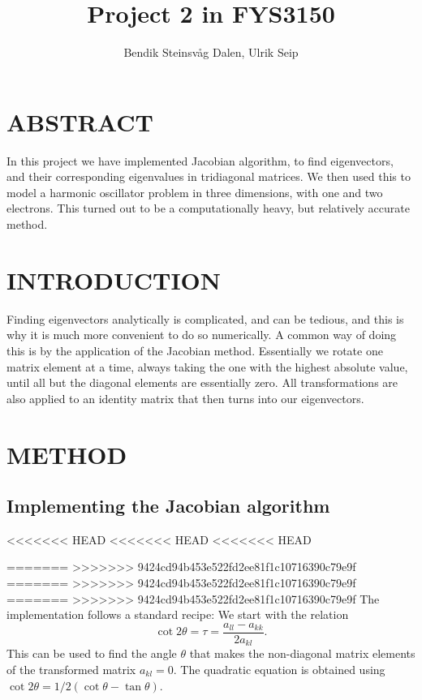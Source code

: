 \documentclass[a4paper]{article}
\title{Project 2 in FYS3150}
\author{Bendik Steinsvåg Dalen, Ulrik Seip}
\begin{document}
\maketitle

\section{ABSTRACT}

In this project we have implemented Jacobian algorithm, to find eigenvectors, and their corresponding eigenvalues in tridiagonal matrices. We then used this to model a harmonic oscillator problem in three dimensions, with one and two electrons. This turned out to be a computationally heavy, but relatively accurate method.

\section{INTRODUCTION}

Finding eigenvectors analytically is complicated, and can be tedious, and this is why it is much more convenient to do so numerically. A common way of doing this is by the application of the Jacobian method. Essentially we rotate one matrix element at a time, always taking the one with the highest absolute value, until all but the diagonal elements are essentially zero. All transformations are also applied to an identity matrix that then turns into our eigenvectors. 

\section{METHOD}

\subsection{Implementing the Jacobian algorithm}
<<<<<<< HEAD
<<<<<<< HEAD
<<<<<<< HEAD

=======
>>>>>>> 9424cd94b453e522fd2ee81f1c10716390c79e9f
=======
>>>>>>> 9424cd94b453e522fd2ee81f1c10716390c79e9f
=======
>>>>>>> 9424cd94b453e522fd2ee81f1c10716390c79e9f
The implementation follows a standard recipe:
We start with the relation
\begin{equation*}\cot 2\theta=\tau = \frac{a_{ll}-a_{kk}}{2a_{kl}}.
\end{equation*}
This can be used to find the angle $\theta$ that makes the  non-diagonal matrix elements of the transformed matrix 
$a_{kl} = 0$. The quadratic equation is obtained using $\cot 2\theta=1/2(\cot\theta-\tan\theta)$.
\end{document}
